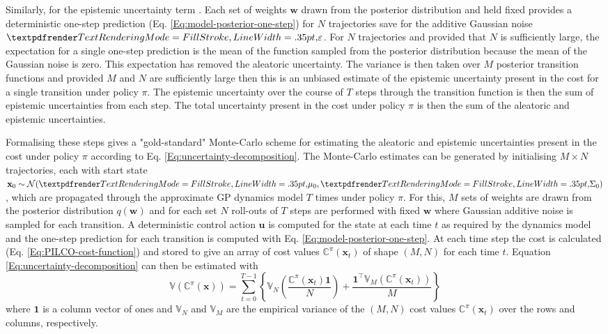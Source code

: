 Similarly, for the epistemic uncertainty term . Each set of weights $\mathbf{w}$ drawn from the posterior distribution and held fixed provides a deterministic one-step prediction (Eq. \ref{Eq:model-posterior-one-step}) for $N$ trajectories save for the additive Gaussian noise $\boldgreek{\varepsilon}$. For $N$ trajectories and provided that $N$ is sufficiently large, the expectation for a single one-step prediction is the mean of the function sampled from the posterior distribution because the mean of the Gaussian noise is zero. This expectation has removed the aleatoric uncertainty. The variance is then taken over $M$ posterior transition functions and provided $M$ and $N$ are sufficiently large then this is an unbiased estimate of the epistemic uncertainty present in the cost for a single transition under policy $\pi$. The epistemic uncertainty over the course of $T$ steps through the transition function is then the sum of epistemic uncertainties from each step. The total uncertainty present in the cost under policy $\pi$ is then the sum of the aleatoric and epistemic uncertainties.

Formalising these steps gives a "gold-standard" Monte-Carlo scheme for estimating the aleatoric and epistemic uncertainties present in the cost under policy $\pi$ according to Eq. \ref{Eq:uncertainty-decomposition}. The Monte-Carlo estimates can be generated by initialising $M\times N$ trajectories, each with start state $\mathbf{x}_{0} \sim \mathcal{N}(\boldgreek{\mu}_{0},\boldgreek{\Sigma}_{0})$, which are propagated through the approximate GP dynamics model $T$ times under policy $\pi$. For this, $M$ sets of weights are drawn from the posterior distribution $q(\mathbf{w})$ and for each set $N$ roll-outs of $T$ steps are performed with fixed $\mathbf{w}$ where Gaussian additive noise is sampled for each transition. A deterministic control action $\mathbf{u}$ is computed for the state at each time $t$ as required by the dynamics model and the one-step prediction for each transition is computed with Eq. \ref{Eq:model-posterior-one-step}. At each time step the cost is calculated (Eq. \ref{Eq:PILCO-cost-function}) and stored to give an array of cost values $\mathbb{C}^{\pi}(\mathbf{x}_t)$ of shape $(M,N)$ for each time $t$. Equation \ref{Eq:uncertainty-decomposition} can then be estimated with
\begin{equation}
    \mathbb{V}(\mathbb{C}^{\pi}(\mathbf{x}))=\sum^{T-1}_{t=0}\left\{\mathbb{V}_{N}\left(\frac{\mathbb{C}^{\pi}(\mathbf{x}_{t})\mathbf{1}}{N}\right)+\frac{\mathbf{1}^{\top}\mathbb{V}_{M}\left(\mathbb{C}^{\pi}(\mathbf{x}_{t})\right)}{M}\right\}
    \label{Eq:MC-uncertainty-decomposition}
\end{equation}
where $\mathbf{1}$ is a column vector of ones and $\mathbb{V}_{N}$ and $\mathbb{V}_{M}$ are the empirical variance of the $(M,N)$ cost values $\mathbb{C}^{\pi}(\mathbf{x}_t)$ over the rows and columns, respectively.

